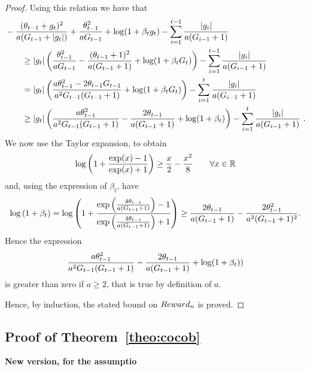 \begin{proof}
Using this relation we have that
\begin{align*}
&-\frac{(\theta_{t-1}+g_t)^2}{a (G_{t-1}+|g_t|)} + \frac{\theta_{t-1}^2}{a G_{t-1}}+\log(1+\beta_t g_t)-\sum_{i=1}^{t-1} \frac{|g_i|}{a (G_{i-1} + 1)} \\
&\qquad \geq |g_t| \left(\frac{\theta_{t-1}^2}{a G_{t-1}} - \frac{(\theta_{t-1}+1)^2}{a (G_{t-1} + 1)} + \log(1+\beta_t G_t)\right) - \sum_{i=1}^{t-1} \frac{|g_i|}{a (G_{i-1} + 1)}\\
&\qquad = |g_t| \left(\frac{a \theta_{t-1}^2 -2 \theta_{t-1} G_{t-1} }{a^2 G_{t-1}(G_{t-1} + 1)} + \log(1+\beta_t G_t)\right) - \sum_{i=1}^{t} \frac{|g_i|}{a (G_{i-1} + 1)}\\
&\qquad \geq |g_t| \left(\frac{a \theta_{t-1}^2}{a^2 G_{t-1}(G_{t-1} + 1)}-\frac{2 \theta_{t-1}}{a (G_{t-1} + 1)} + \log(1+\beta_t)\right) - \sum_{i=1}^{t} \frac{|g_i|}{a (G_{i-1} + 1)}~.
\end{align*}
We now use the Taylor expansion, to obtain
\[
\log\left(1+\frac{\exp(x)-1}{\exp(x)+1}\right) \geq \frac{x}{2} -\frac{x^2}{8} \qquad \forall x \in \mathbb{R}
\]
and, using the expression of $\beta_t$, have
\[
\log\left(1+\beta_t\right) 
= \log\left(1+\frac{\exp\left(\frac{4 \theta_{t-1}}{a (G_{t-1} + 1)}\right)-1}{\exp\left(\frac{4 \theta_{t-1}}{a (G_{t-1} + 1)}\right)+1}\right) 
\geq \frac{2 \theta_{t-1}}{a (G_{t-1} + 1)} -\frac{2 \theta_{t-1}^2}{a^2 (G_{t-1} + 1)^2}.
\]
Hence the expression 
\[
\frac{a \theta_{t-1}^2}{a^2 G_{t-1}(G_{t-1} + 1)}-\frac{2 \theta_{t-1}}{a (G_{t-1} + 1)} + \log(1+\beta_t))
\]
is greater than zero if $a \geq 2$, that is true by definition of $a$.

Hence, by induction, the stated bound on $Reward_n$ is proved.
\end{proof}


\subsection{Proof of Theorem~\ref{theo:cocob}}
\textbf{New version, for the assumptio}

